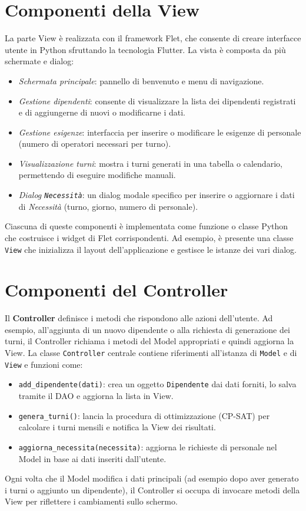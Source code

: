\documentclass[a4paper,12pt]{report}
\begin{document}
\section{Componenti della View}
La parte View \`e realizzata con il framework Flet, che consente di creare interfacce utente in Python sfruttando la tecnologia Flutter. La vista \`e composta da pi\`u schermate e dialog:
\begin{itemize}
    \item \emph{Schermata principale}: pannello di benvenuto e menu di navigazione.
    \item \emph{Gestione dipendenti}: consente di visualizzare la lista dei dipendenti registrati e di aggiungerne di nuovi o modificarne i dati.
    \item \emph{Gestione esigenze}: interfaccia per inserire o modificare le esigenze di personale (numero di operatori necessari per turno).
    \item \emph{Visualizzazione turni}: mostra i turni generati in una tabella o calendario, permettendo di eseguire modifiche manuali.
    \item \emph{Dialog \texttt{Necessit\`a}}: un dialog modale specifico per inserire o aggiornare i dati di \emph{Necessit\`a} (turno, giorno, numero di personale).
\end{itemize}
Ciascuna di queste componenti \`e implementata come funzione o classe Python che costruisce i widget di Flet corrispondenti. Ad esempio, \`e presente una classe \texttt{View} che inizializza il layout dell'applicazione e gestisce le istanze dei vari dialog.

\section{Componenti del Controller}
Il \textbf{Controller} definisce i metodi che rispondono alle azioni dell'utente. Ad esempio, all'aggiunta di un nuovo dipendente o alla richiesta di generazione dei turni, il Controller richiama i metodi del Model appropriati e quindi aggiorna la View. La classe \texttt{Controller} centrale contiene riferimenti all'istanza di \texttt{Model} e di \texttt{View} e funzioni come:
\begin{itemize}
    \item \texttt{add\_dipendente(dati)}: crea un oggetto \texttt{Dipendente} dai dati forniti, lo salva tramite il DAO e aggiorna la lista in View.
    \item \texttt{genera\_turni()}: lancia la procedura di ottimizzazione (CP-SAT) per calcolare i turni mensili e notifica la View dei risultati.
    \item \texttt{aggiorna\_necessita(necessita)}: aggiorna le richieste di personale nel Model in base ai dati inseriti dall'utente.
\end{itemize}
Ogni volta che il Model modifica i dati principali (ad esempio dopo aver generato i turni o aggiunto un dipendente), il Controller si occupa di invocare metodi della View per riflettere i cambiamenti sullo schermo.
\end{document}

